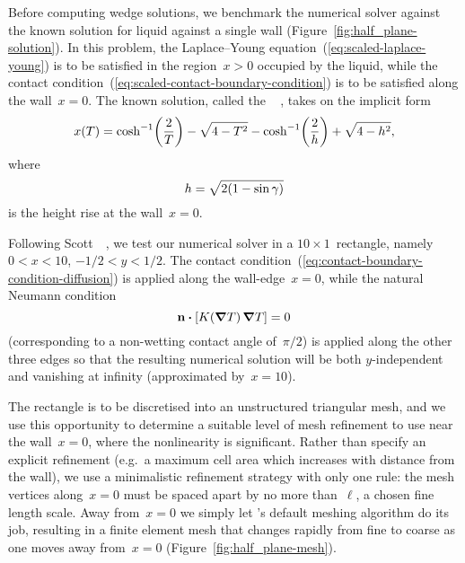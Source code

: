 Before computing wedge solutions,
we benchmark the numerical solver
against the known solution
for liquid against a single wall
(Figure~\ref{fig:half_plane-solution}).
In this problem,
the Laplace--Young equation~(\ref{eq:scaled-laplace-young})
is to be satisfied in the region~$x > 0$ occupied by the liquid,
while the contact condition~(\ref{eq:scaled-contact-boundary-condition})
is to be satisfied along the wall~$x = 0$.
The known solution,
called the ~%
  \cite{anderson-2006-exact-solutions-laplace-young},
takes on the implicit form
\begin{equation}
  x (T) =
    \cosh^{-1} \roundbr*{\frac{2}{T}} - \sqrt{4 - T^2}
    - \cosh^{-1} \roundbr*{\frac{2}{h}} + \sqrt{4 - h^2},
  \label{eq:half-plane-solution}
\end{equation}
where
\begin{equation}
  \savecontent{
    h = \sqrt{2 (1 - \sin\gamma)}
  }{eq:half-plane-height}
\end{equation}
is the height rise at the wall~$x = 0$.

\begin{figure}
\end{figure}

Following Scott~\etal~\cite{scott-2005-computation-capillary-laplace-young},
we test our numerical solver in a $10 \times 1$~rectangle,
namely $0 < x < 10$, $-1/2 < y < 1/2$.
The contact condition~(\ref{eq:contact-boundary-condition-diffusion})
is applied along the wall-edge~$x = 0$,
while the natural Neumann condition
\begin{equation}
  \normalvec \dotp \squarebr[\bulkysize]{K (\del T) \del T} = 0
  \label{eq:natural-boundary-condition-diffusion}
\end{equation}
(corresponding to a non-wetting contact angle of~$\pi/2$)
is applied along the other three edges
so that the resulting numerical solution will be both $y$-independent
and vanishing at infinity (approximated by~$x = 10$).

The rectangle is to be discretised into an unstructured triangular mesh,
and we use this opportunity to determine
a suitable level of mesh refinement to use
near the wall~$x = 0$, where the nonlinearity is significant.
Rather than specify an explicit refinement
(e.g.~a maximum cell area which increases with distance from the wall),
we use a minimalistic refinement strategy with only one rule:
the mesh vertices along~$x = 0$ must be spaced apart
by no more than~$\ell$, a chosen fine length scale.
Away from~$x = 0$ we simply let 's
default meshing algorithm do its job,
resulting in a finite element mesh
that changes rapidly from fine to coarse
as one moves away from~$x = 0$
(Figure~\ref{fig:half_plane-mesh}).

